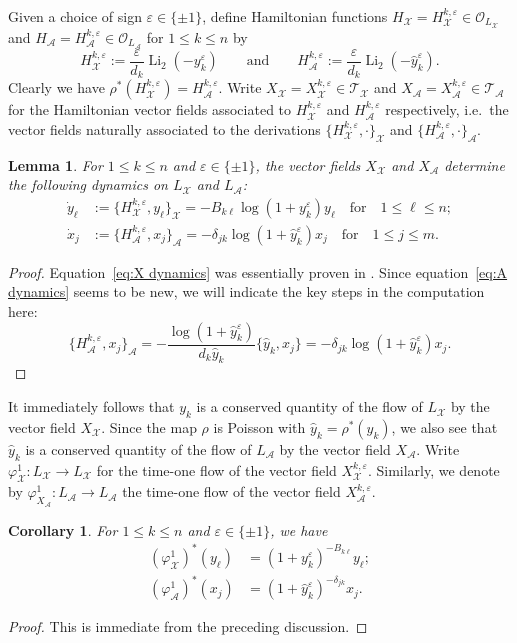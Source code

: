 \documentclass{amsart}
\newtheorem{corollary}[theorem]{Corollary}
\newtheorem{lemma}[theorem]{Lemma}
\numberwithin{equation}{section}
\newcommand{\cA}{\mathcal{A}}
\newcommand{\cO}{\mathcal{O}}
\newcommand{\cX}{\mathcal{X}}
\newcommand{\cT}{\mathcal{T}}
\newcommand{\Li}{\operatorname{Li}}
\begin{document}
Given a choice of sign $\varepsilon\in\{\pm1\}$, define Hamiltonian functions $H_\cX=H^{k,\varepsilon}_\cX\in\cO_{L_\cX}$ and $H_\cA=H^{k,\varepsilon}_\cA\in\cO_{L_\cA}$ for $1\le k\le n$ by
\begin{equation}
  \label{eq:hamiltonians}
  H_\cX^{k,\varepsilon}:=\frac{\varepsilon}{d_k}\Li_2(-y_k^\varepsilon)\qquad\text{and}\qquad H_\cA^{k,\varepsilon}:=\frac{\varepsilon}{d_k}\Li_2(-\hat y_k^\varepsilon).
\end{equation}
Clearly we have $\rho^*(H_\cX^{k,\varepsilon})=H_\cA^{k,\varepsilon}$.
Write $X_\cX=X_\cX^{k,\varepsilon}\in\cT_\cX$ and $X_\cA=X_\cA^{k,\varepsilon}\in\cT_\cA$ for the Hamiltonian vector fields associated to $H_\cX^{k,\varepsilon}$ and $H_\cA^{k,\varepsilon}$ respectively, i.e.\ the vector fields naturally associated to the derivations $\{H_\cX^{k,\varepsilon},\cdot\}_\cX$ and $\{H_\cA^{k,\varepsilon},\cdot\}_\cA$.
\begin{lemma}
  \label{le:hamiltonian dynamics}
  For $1\le k\le n$ and $\varepsilon\in\{\pm1\}$, the vector fields $X_\cX$ and $X_\cA$ determine the following dynamics on $L_\cX$ and $L_\cA$:
  \begin{align}
    \label{eq:X dynamics}
    \dot y_\ell&:=\{H_\cX^{k,\varepsilon},y_\ell\}_\cX=-B_{k\ell}\log(1+y_k^\varepsilon)y_\ell\quad\text{for}\quad 1\le\ell\le n;\\
    \label{eq:A dynamics}
    \dot x_j&:=\{H_\cA^{k,\varepsilon},x_j\}_\cA=-\delta_{jk}\log(1+\hat y_k^\varepsilon)x_j\quad\text{for}\quad 1\le j\le m.
  \end{align}
\end{lemma}
\begin{proof}
  Equation~\eqref{eq:X dynamics} was essentially proven in \cite{MR3691969}.
  Since equation~\eqref{eq:A dynamics} seems to be new, we will indicate the key steps in the computation here:
  \[\{H_\cA^{k,\varepsilon},x_j\}_\cA=-\frac{\log(1+\hat y_k^\varepsilon)}{d_k\hat y_k}\{\hat y_k,x_j\}=-\delta_{jk}\log(1+\hat y_k^\varepsilon)x_j.\]
\end{proof}

It immediately follows that $y_k$ is a conserved quantity of the flow of $L_\cX$ by the vector field $X_\cX$.
Since the map $\rho$ is Poisson with $\hat y_k=\rho^*(y_k)$, we also see that $\hat y_k$ is a conserved quantity of the flow of $L_\cA$ by the vector field $X_\cA$.
Write $\varphi_\cX^1:L_\cX\to L_\cX$ for the time-one flow of the vector field $X_\cX^{k,\varepsilon}$.
Similarly, we denote by $\varphi_{X_\cA}^1:L_\cA\to L_\cA$ the time-one flow of the vector field $X_\cA^{k,\varepsilon}$.
\begin{corollary}
  \label{cor:time-one flows}
  For $1\le k\le n$ and $\varepsilon\in\{\pm1\}$, we have
  \begin{align*}
    (\varphi_\cX^1)^*(y_\ell)&=(1+y_k^\varepsilon)^{-B_{k\ell}}y_\ell;\\
    (\varphi_\cA^1)^*(x_j)&=(1+\hat y_k^\varepsilon)^{-\delta_{jk}}x_j.
  \end{align*}
\end{corollary}
\begin{proof}
  This is immediate from the preceding discussion.
\end{proof}
\end{document}
